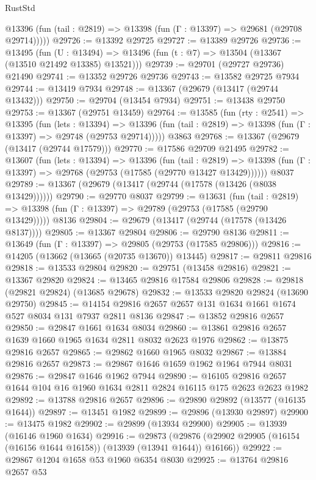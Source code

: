 \begin{lexlean}{RustStd}
\begin{coremodule}
      @13396 (fun (tail : @2819) => @13398 (fun (Γ : @13397) => @29681 (@29708 @29714)))))
@29726 := @13392 @29725
@29727 := @13389 @29726
@29736 := @13495
    (fun (U : @13494) => @13496 (fun (t : @7) => @13504 (@13367 (@13510 @21492 @13385) @13521)))
@29739 := @29701 (@29727 @29736) @21490
@29741 := @13352 @29726 @29736
@29743 := @13582 @29725 @7934
@29744 := @13419 @7934
@29748 := @13367 (@29679 (@13417 (@29744 @13432)))
@29750 := @29704 (@13454 @7934)
@29751 := @13438 @29750
@29753 := @13367 (@29751 @13459)
@29764 := @13585
    (fun (rty : @2541) =>
    @13395
      (fun (lets : @13394) =>
      @13396 (fun (tail : @2819) => @13398 (fun (Γ : @13397) => @29748 (@29753 @29714)))))
    @3863
@29768 := @13367 (@29679 (@13417 (@29744 @17579)))
@29770 := @17586 @29709 @21495
@29782 := @13607
    (fun (lets : @13394) =>
    @13396
      (fun (tail : @2819) =>
      @13398 (fun (Γ : @13397) => @29768 (@29753 (@17585 (@29770 @13427 @13429))))))
    @8037
@29789 := @13367 (@29679 (@13417 (@29744 (@17578 (@13426 (@8038 @13429))))))
@29790 := @29770 @8037
@29799 := @13631
    (fun (tail : @2819) => @13398 (fun (Γ : @13397) => @29789 (@29753 (@17585 (@29790 @13429)))))
    @8136
@29804 := @29679 (@13417 (@29744 (@17578 (@13426 @8137))))
@29805 := @13367 @29804
@29806 := @29790 @8136
@29811 := @13649 (fun (Γ : @13397) => @29805 (@29753 (@17585 @29806)))
@29816 := @14205 (@13662 (@13665 (@20735 @13670)) @13445)
@29817 := @29811 @29816
@29818 := @13533 @29804
@29820 := @29751 (@13458 @29816)
@29821 := @13367 @29820
@29824 := @13465 @29816 @17584 @29806
@29828 := @29818 (@29821 @29824) (@13685 @29678)
@29832 := @13533 @29820 @29824 (@13690 @29750)
@29845 := @14154 @29816 @2657 @2657 @131 @1634 @1661 @1674 @527 @8034 @131 @7937 @2811 @8136
@29847 := @13852 @29816 @2657
@29850 := @29847 @1661 @1634 @8034
@29860 := @13861 @29816 @2657 @1639 @1660 @1965 @1634 @2811 @8032 @2623 @1976
@29862 := @13875 @29816 @2657
@29865 := @29862 @1660 @1965 @8032
@29867 := @13884 @29816 @2657
@29873 := @29867 @1646 @1659 @1962 @1964 @7944 @8031
@29876 := @29847 @1646 @1962 @7944
@29890 := @16105 @29816 @2657 @1644 @104 @16 @1960 @1634 @2811 @2824 @16115 @175 @2623 @2623 @1982
@29892 := @13788 @29816 @2657
@29896 := @29890 @29892 (@13577 (@16135 @1644))
@29897 := @13451 @1982
@29899 := @29896 (@13930 @29897)
@29900 := @13475 @1982
@29902 := @29899 (@13934 @29900)
@29905 := @13939 (@16146 @1960 @1634)
@29916 := @29873
    (@29876 (@29902 @29905 (@16154 (@16156 @1644 @16158)) (@13939 (@13941 @1644)) @16166))
@29922 := @29867 @1204 @1658 @53 @1960 @6354 @8030
@29925 := @13764 @29816 @2657 @53

\end{coremodule}
\end{lexlean}

